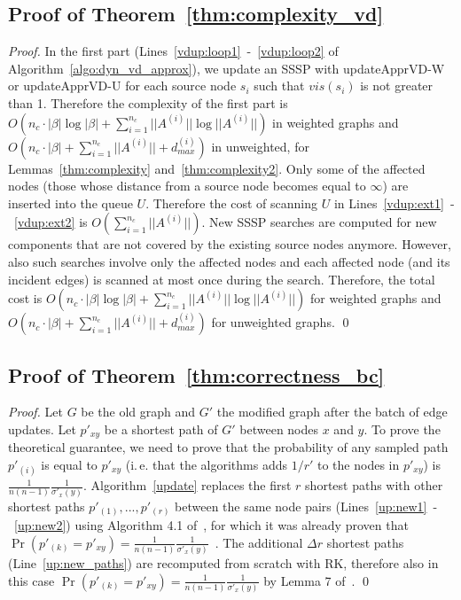 \documentclass[english]{llncs}
\newcommand{\ie}{i.\,e.\xspace}
\newcommand{\rk}{\textsf{RK}\xspace}
\newcommand{\upvd}{\textsf{updateApprVD-W}\xspace}
\newcommand{\upvdu}{\textsf{updateApprVD-U}\xspace}
\begin{document}
\subsection{Proof of Theorem~\ref{thm:complexity_vd}}
\label{sub:proof_complexity_vd}
\begin{proof}
In the first part (Lines~\ref{vdup:loop1}~-~\ref{vdup:loop2} of Algorithm~\ref{algo:dyn_vd_approx}), we update an SSSP with \upvd or \upvdu for each source node $s_i$ such that $vis(s_i)$ is not greater than 1. Therefore the complexity of the first part is $O(n_c\cdot |\beta |\log |\beta |+\sum_{i=1}^{n_c}||A^{(i)}|| \log ||A^{(i)}||)$ in weighted graphs and $O(n_c\cdot |\beta |+\sum_{i=1}^{n_c}||A^{(i)}||+d^{(i)}_{max})$ in unweighted, for Lemmas~\ref{thm:complexity} and~\ref{thm:complexity2}. Only some of the affected nodes (those whose distance from a source node becomes equal to $\infty$) are inserted into the queue $U$. Therefore the cost of scanning $U$ in Lines~\ref{vdup:ext1}~-~\ref{vdup:ext2} is $O(\sum_{i=1}^{n_c}||A^{(i)}||)$. New SSSP searches are computed for new components that are not covered by the existing source nodes anymore. However, also such searches involve only the affected nodes and each affected node (and its incident edges) is scanned at most once during the search. Therefore, the total cost is $O(n_c\cdot |\beta |\log |\beta |+\sum_{i=1}^{n_c}||A^{(i)}|| \log ||A^{(i)}||)$ for weighted graphs and $O(n_c\cdot |\beta |+\sum_{i=1}^{n_c}||A^{(i)}||+d^{(i)}_{max})$ for unweighted graphs. \qed
\end{proof}

\subsection{Proof of Theorem~\ref{thm:correctness_bc}}
\label{sub:proof_correctness_bc}
\begin{proof}
Let $G$ be the old graph and $G'$ the modified graph after the batch of edge updates. Let $p'_{xy}$ be a shortest path of $G'$ between nodes $x$ and
$y$. To prove the theoretical guarantee, we need to prove that the probability of any sampled path $p'_{(i)}$ is equal to $p'_{xy}$ (\ie that the algorithms adds $1/r'$ to the nodes in $p'_{xy}$) is $\frac{1}{n(n-1)}\frac{1}{\sigma'_{x}(y)}$.
Algorithm~\ref{update} replaces the first $r$ shortest paths with other shortest paths $p'_{(1)},...,p'_{(r)}$ between the same node pairs (Lines~\ref{up:new1}~-~\ref{up:new2}) using Algorithm 4.1 of~\cite{DBLP:conf/alenex/BergaminiMS15}, for which it was already proven that $\Pr(p'_{(k)}=p'_{xy})=\frac{1}{n(n-1)}\frac{1}{\sigma'_{x}(y)}$~\cite[Theorem 4.1]{DBLP:conf/alenex/BergaminiMS15}. The additional $\Delta r$ shortest paths (Line~\ref{up:new_paths}) are recomputed from scratch with \rk, therefore also in this case $\Pr(p'_{(k)}=p'_{xy})=\frac{1}{n(n-1)}\frac{1}{\sigma'_{x}(y)}$ by Lemma 7 of~\cite{DBLP:conf/wsdm/RiondatoK14}.
 \qed
\end{proof}
\end{document}
